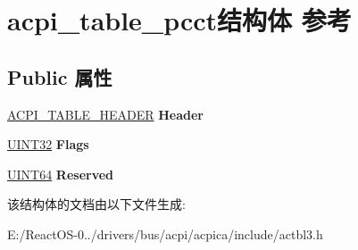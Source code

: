 \hypertarget{structacpi__table__pcct}{}\section{acpi\+\_\+table\+\_\+pcct结构体 参考}
\label{structacpi__table__pcct}
\subsection*{Public 属性}
\begin{DoxyCompactItemize}
\item 
\mbox{\label{structacpi__table__pcct_a2894572113bbe7e43eb326c6ba0297da}} 
\hyperlink{structacpi__table__header}{A\+C\+P\+I\+\_\+\+T\+A\+B\+L\+E\+\_\+\+H\+E\+A\+D\+ER} {\bfseries Header}
\item 
\mbox{\label{structacpi__table__pcct_a4c8f113d25c1664f2eed45cdf7968fef}} 
\hyperlink{_processor_bind_8h_ae1e6edbbc26d6fbc71a90190d0266018}{U\+I\+N\+T32} {\bfseries Flags}
\item 
\mbox{\label{structacpi__table__pcct_a54d8355a726728e3a0dcc02eb2d5da9d}} 
\hyperlink{_processor_bind_8h_a57be03562867144161c1bfee95ca8f7c}{U\+I\+N\+T64} {\bfseries Reserved}
\end{DoxyCompactItemize}


该结构体的文档由以下文件生成\+:\begin{DoxyCompactItemize}
\item 
E\+:/\+React\+O\+S-\/0../drivers/bus/acpi/acpica/include/actbl3.\+h\end{DoxyCompactItemize}
